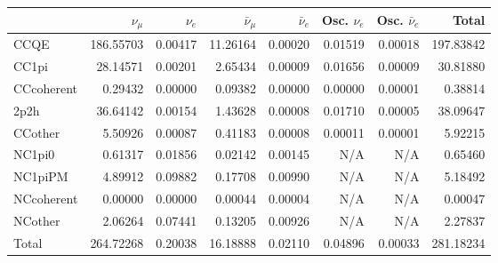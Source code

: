 \begin{tabular} { | l ||r | r | r | r | r | r | | r | }
\hline
              & $\nu_\mu$            & $\nu_e$              & $\bar{\nu}_{\mu}$    & $\bar{\nu}_{e}$      & Osc. $\nu_e$         & Osc. $\bar{\nu}_{e}$ & Total                \\ \hline\hline
 CCQE         & 186.55703            & 0.00417              & 11.26164             & 0.00020              & 0.01519              & 0.00018              & 197.83842            \\ \hline
 CC1pi        & 28.14571             & 0.00201              & 2.65434              & 0.00009              & 0.01656              & 0.00009              & 30.81880             \\ \hline
 CCcoherent   & 0.29432              & 0.00000              & 0.09382              & 0.00000              & 0.00000              & 0.00001              & 0.38814              \\ \hline
 2p2h         & 36.64142             & 0.00154              & 1.43628              & 0.00008              & 0.01710              & 0.00005              & 38.09647             \\ \hline
 CCother      & 5.50926              & 0.00087              & 0.41183              & 0.00008              & 0.00011              & 0.00001              & 5.92215              \\ \hline
 NC1pi0       & 0.61317              & 0.01856              & 0.02142              & 0.00145              & N/A                  & N/A                  & 0.65460              \\ \hline
 NC1piPM      & 4.89912              & 0.09882              & 0.17708              & 0.00990              & N/A                  & N/A                  & 5.18492              \\ \hline
 NCcoherent   & 0.00000              & 0.00000              & 0.00044              & 0.00004              & N/A                  & N/A                  & 0.00047              \\ \hline
 NCother      & 2.06264              & 0.07441              & 0.13205              & 0.00926              & N/A                  & N/A                  & 2.27837              \\ \hline
\hline
 Total        & 264.72268            & 0.20038              & 16.18888             & 0.02110              & 0.04896              & 0.00033              & 281.18234            \\ \hline

\end{tabular}

